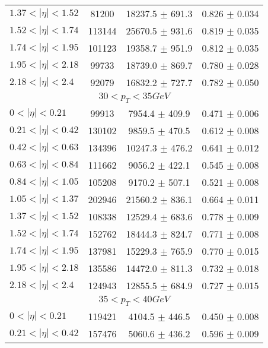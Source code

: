 \begin{tabular}{lccc}
$1.37 < |\eta| <1.52$          & 81200      & 18237.5    $\pm$ 691.3 & 0.826      $\pm$ 0.034 \\
$1.52 < |\eta| <1.74$          & 113144     & 25670.5    $\pm$ 931.6 & 0.819      $\pm$ 0.035 \\
$1.74 < |\eta| <1.95$          & 101123     & 19358.7    $\pm$ 951.9 & 0.812      $\pm$ 0.035 \\
$1.95 < |\eta| <2.18$          & 99733      & 18739.0    $\pm$ 869.7 & 0.780      $\pm$ 0.028 \\
$2.18 < |\eta| <2.4$           & 92079      & 16832.2    $\pm$ 727.7 & 0.782      $\pm$ 0.050 \\
\hline
\multicolumn{4}{c}{$30 < p_{T} < 35 GeV$} \\
\hline
$0 < |\eta| <0.21$             & 99913      & 7954.4     $\pm$ 409.9 & 0.471      $\pm$ 0.006 \\
$0.21 < |\eta| <0.42$          & 130102     & 9859.5     $\pm$ 470.5 & 0.612      $\pm$ 0.008 \\
$0.42 < |\eta| <0.63$          & 134396     & 10247.3    $\pm$ 476.2 & 0.641      $\pm$ 0.012 \\
$0.63 < |\eta| <0.84$          & 111662     & 9056.2     $\pm$ 422.1 & 0.545      $\pm$ 0.008 \\
$0.84 < |\eta| <1.05$          & 105208     & 9170.2     $\pm$ 507.1 & 0.521      $\pm$ 0.008 \\
$1.05 < |\eta| <1.37$          & 202946     & 21560.2    $\pm$ 836.1 & 0.664      $\pm$ 0.011 \\
$1.37 < |\eta| <1.52$          & 108338     & 12529.4    $\pm$ 683.6 & 0.778      $\pm$ 0.009 \\
$1.52 < |\eta| <1.74$          & 152762     & 18444.3    $\pm$ 824.7 & 0.771      $\pm$ 0.008 \\
$1.74 < |\eta| <1.95$          & 137981     & 15229.3    $\pm$ 765.9 & 0.770      $\pm$ 0.015 \\
$1.95 < |\eta| <2.18$          & 135586     & 14472.0    $\pm$ 811.3 & 0.732      $\pm$ 0.018 \\
$2.18 < |\eta| <2.4$           & 124943     & 12855.5    $\pm$ 684.9 & 0.727      $\pm$ 0.015 \\
\hline
\multicolumn{4}{c}{$35 < p_{T} < 40 GeV$} \\
\hline
$0 < |\eta| <0.21$             & 119421     & 4104.5     $\pm$ 446.5 & 0.450      $\pm$ 0.008 \\
$0.21 < |\eta| <0.42$          & 157476     & 5060.6     $\pm$ 436.2 & 0.596      $\pm$ 0.009 \\

\end{tabular}
